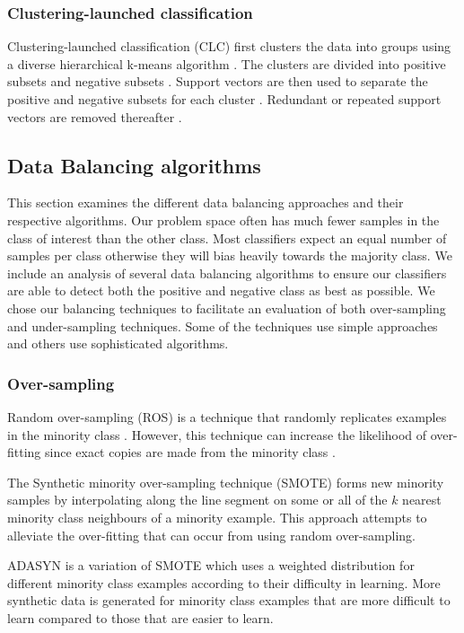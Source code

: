 \documentclass{sig-alternate-05-2015}
\begin{document}
	\subsubsection{Clustering-launched classification}
	Clustering-launched classification (CLC) first clusters the data into groups using a diverse hierarchical k-means algorithm \cite{Luo20097562}. The clusters are divided into positive subsets and negative subsets \cite{Luo20097562}. Support vectors are then used to separate the positive and negative subsets for each cluster \cite{Luo20097562}. Redundant or repeated support vectors are removed thereafter \cite{Luo20097562}.
	
	\subsection{Data Balancing algorithms}
	\label{sec:data_balancing_algorithms}
	This section examines the different data balancing approaches and their respective algorithms. Our problem space often has much fewer samples in the class of interest than the other class. Most classifiers expect an equal number of samples per class otherwise they will bias heavily towards the majority class. We include an analysis of several data balancing algorithms to ensure our classifiers are able to detect both the positive and negative class as best as possible. We chose our balancing techniques to facilitate an evaluation of both over-sampling and under-sampling techniques. Some of the techniques use simple approaches and others use sophisticated algorithms.
	\subsubsection{Over-sampling}
	Random over-sampling (ROS) is a technique that randomly replicates examples in the minority class \cite{Batista:2004:SBS:1007730.1007735}. However, this technique can increase the likelihood of over-fitting since exact copies are made from the minority class \cite{Batista:2004:SBS:1007730.1007735}.
	
	The Synthetic minority over-sampling technique (SMOTE) \cite{Chawla:2002:SSM:1622407.1622416} forms new minority samples by interpolating along the line segment on some or all of the $k$ nearest minority class neighbours of a minority example. This approach attempts to alleviate the over-fitting that can occur from using random over-sampling.
	
	ADASYN \cite{4633969} is a variation of SMOTE which uses a weighted distribution for different minority class examples according to their difficulty in learning. More synthetic data is generated for minority class examples that are more difficult to learn compared to those that are easier to learn.
	
\end{document}

